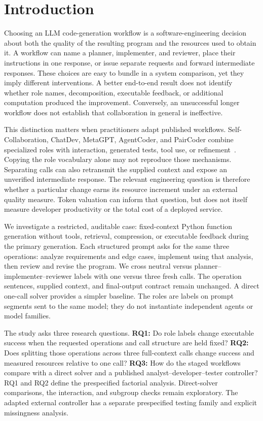 \section{Introduction}
Choosing an LLM code-generation workflow is a software-engineering decision about both the quality of the resulting program and the resources used to obtain it. A workflow can name a planner, implementer, and reviewer, place their instructions in one response, or issue separate requests and forward intermediate responses. These choices are easy to bundle in a system comparison, yet they imply different interventions. A better end-to-end result does not identify whether role names, decomposition, executable feedback, or additional computation produced the improvement. Conversely, an unsuccessful longer workflow does not establish that collaboration in general is ineffective.

This distinction matters when practitioners adapt published workflows. Self-Collaboration, ChatDev, MetaGPT, AgentCoder, and PairCoder combine specialized roles with interaction, generated tests, tool use, or refinement~\cite{dong2023selfcollaboration,qian2024chatdev,hong2024metagpt,huang2023agentcoder,zhang2024paircoder}. Copying the role vocabulary alone may not reproduce those mechanisms. Separating calls can also retransmit the supplied context and expose an unverified intermediate response. The relevant engineering question is therefore whether a particular change earns its resource increment under an external quality measure. Token valuation can inform that question, but does not itself measure developer productivity or the total cost of a deployed service.

We investigate a restricted, auditable case: fixed-context Python function generation without tools, retrieval, compression, or executable feedback during the primary generation. Each structured prompt asks for the same three operations: analyze requirements and edge cases, implement using that analysis, then review and revise the program. We cross neutral versus planner--implementer--reviewer labels with one versus three fresh calls. The operation sentences, supplied context, and final-output contract remain unchanged. A direct one-call solver provides a simpler baseline. The roles are labels on prompt segments sent to the same model; they do not instantiate independent agents or model families.

The study asks three research questions. \textbf{RQ1:} Do role labels change executable success when the requested operations and call structure are held fixed? \textbf{RQ2:} Does splitting those operations across three full-context calls change success and measured resources relative to one call? \textbf{RQ3:} How do the staged workflows compare with a direct solver and a published analyst--developer--tester controller? RQ1 and RQ2 define the prespecified factorial analysis. Direct-solver comparisons, the interaction, and subgroup checks remain exploratory. The adapted external controller has a separate prespecified testing family and explicit missingness analysis.


